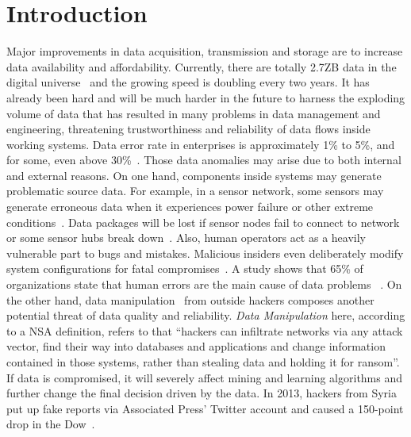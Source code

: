 \documentclass[10pt,conference,letterpaper]{IEEEtran}
\begin{document}
	\section{Introduction}
		Major improvements in data acquisition, transmission and storage are to increase data availability and affordability. Currently, there are totally 2.7ZB data in the digital universe~\cite{bigDataStatistics} and the growing speed is doubling every two years.
		It has already been hard and will be much harder in the future to harness the exploding volume of data that has resulted in many problems in data management and engineering, threatening trustworthiness and reliability of data flows inside working systems.
		Data error rate in enterprises is approximately 1\% to 5\%, and for some, even above 30\%~\cite{saha2014data}. Those data anomalies may arise due to both internal and external reasons. On one hand, components inside systems may generate problematic source data. For example, in a sensor network, some sensors may generate erroneous data when it experiences power failure or other extreme conditions~\cite{rassam2014adaptive}. Data packages will be lost if sensor nodes fail to connect to network or some sensor hubs break down~\cite{herodotou2014scalable}. Also, human operators act as a heavily vulnerable part to bugs and mistakes. Malicious insiders even deliberately modify system configurations for fatal compromises~\cite{schuster2015vc3}. A study shows that 65\% of organizations state that human errors are the main  cause of data problems~\cite{humanError} .
		On the other hand, data manipulation~\cite{dataManipulation} from outside hackers composes another potential threat of data quality and reliability. \textit{Data Manipulation} here, according to a NSA definition, refers to that ``hackers can infiltrate networks via any attack vector, find their way into databases and applications and change information contained in those systems, rather than stealing data and holding it for ransom''.
		If data is compromised, it will severely affect mining and learning algorithms and further change the final decision driven by the data. In 2013, hackers from Syria put up fake reports via Associated Press' Twitter account and caused a 150-point drop in the Dow~\cite{SyriaHacker}.
		
\end{document}
